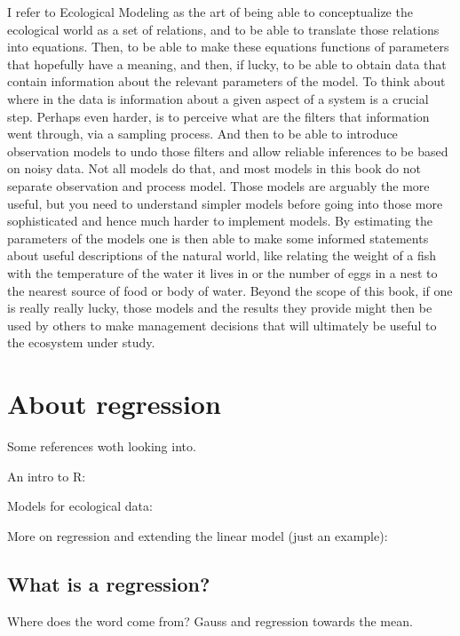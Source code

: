 \documentclass[
]{book}
\begin{document}
I refer to Ecological Modeling as the art of being able to conceptualize the ecological world as a set of relations, and to be able to translate those relations into equations. Then, to be able to make these equations functions of parameters that hopefully have a meaning, and then, if lucky, to be able to obtain data that contain information about the relevant parameters of the model. To think about where in the data is information about a given aspect of a system is a crucial step. Perhaps even harder, is to perceive what are the filters that information went through, via a sampling process. And then to be able to introduce observation models to undo those filters and allow reliable inferences to be based on noisy data. Not all models do that, and most models in this book do not separate observation and process model. Those models are arguably the more useful, but you need to understand simpler models before going into those more sophisticated and hence much harder to implement models. By estimating the parameters of the models one is then able to make some informed statements about useful descriptions of the natural world, like relating the weight of a fish with the temperature of the water it lives in or the number of eggs in a nest to the nearest source of food or body of water. Beyond the scope of this book, if one is really really lucky, those models and the results they provide might then be used by others to make management decisions that will ultimately be useful to the ecosystem under study.

\hypertarget{about-regression}{%
\chapter{About regression}\label{about-regression}}

Some references woth looking into.

An intro to R: \citep{Zuur2009a}

Models for ecological data: \citep{Zuur2007}

More on regression and extending the linear model (just an example): \citep[\citet{Zuur2009b}]{Faraway2006}

\hypertarget{what-is-a-regression}{%
\section{What is a regression?}\label{what-is-a-regression}}

Where does the word come from? Gauss and regression towards the mean.
\end{document}

